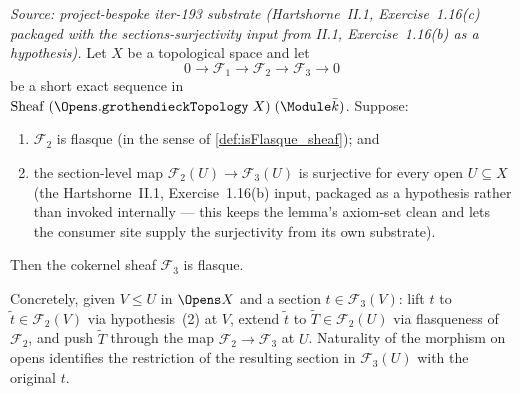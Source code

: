 \begin{lemma}

  \label{lem:flasque_cokernel_short_exact}
  \textit{Source: project-bespoke iter-193 substrate (Hartshorne~II.1,
  Exercise~1.16(c) packaged with the sections-surjectivity input from
  II.1, Exercise~1.16(b) as a hypothesis).}
  Let $X$ be a topological space and let
  \[
    0 \to \mathcal F_1 \to \mathcal F_2 \to \mathcal F_3 \to 0
  \]
  be a short exact sequence in
  $\mathrm{Sheaf}\;(\Opens.\mathtt{grothendieckTopology}\;X)\;
  (\Module \bar k)$. Suppose:
  \begin{enumerate}
    \item $\mathcal F_2$ is flasque (in the sense of
      \cref{def:isFlasque_sheaf}); and
    \item the section-level map
      $\mathcal F_2(U) \to \mathcal F_3(U)$ is surjective for every open
      $U \subseteq X$ (the Hartshorne~II.1, Exercise~1.16(b) input,
      packaged as a hypothesis rather than invoked internally — this
      keeps the lemma's axiom-set clean and lets the consumer site
      supply the surjectivity from its own substrate).
  \end{enumerate}
  Then the cokernel sheaf $\mathcal F_3$ is flasque.

  Concretely, given $V \le U$ in $\Opens X$ and a section
  $t \in \mathcal F_3(V)$: lift $t$ to $\tilde t \in \mathcal F_2(V)$
  via hypothesis~(2) at $V$, extend $\tilde t$ to
  $\tilde T \in \mathcal F_2(U)$ via flasqueness of $\mathcal F_2$, and
  push $\tilde T$ through the map $\mathcal F_2 \to \mathcal F_3$ at
  $U$. Naturality of the morphism on opens identifies the restriction
  of the resulting section in $\mathcal F_3(U)$ with the original $t$.
\end{lemma}

